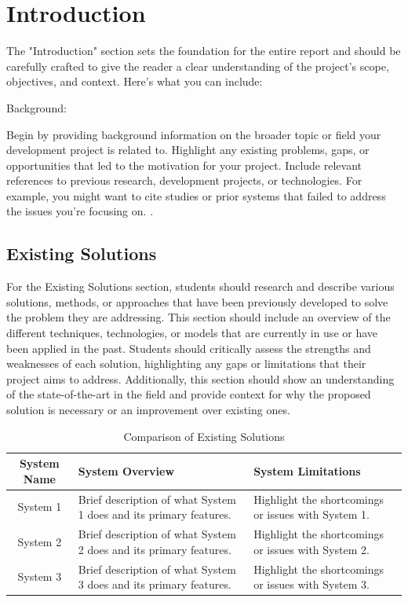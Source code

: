 \chapter{Introduction}
\label{sec:introduction}
The "Introduction" section sets the foundation for the entire report and should be carefully crafted to give the reader a clear understanding of the project’s scope, objectives, and context. Here’s what you can include:

Background:

Begin by providing background information on the broader topic or field your development project is related to.
Highlight any existing problems, gaps, or opportunities that led to the motivation for your project.
Include relevant references to previous research, development projects, or technologies. For example, you might want to cite studies or prior systems that failed to address the issues you're focusing on. \cite{test}.


\section{Existing Solutions}

For the Existing Solutions section, students should research and describe various solutions, methods, or approaches that have been previously developed to solve the problem they are addressing. This section should include an overview of the different techniques, technologies, or models that are currently in use or have been applied in the past. Students should critically assess the strengths and weaknesses of each solution, highlighting any gaps or limitations that their project aims to address. Additionally, this section should show an understanding of the state-of-the-art in the field and provide context for why the proposed solution is necessary or an improvement over existing ones.


\begin{table}[H]
\centering
\caption{Comparison of Existing Solutions}
\begin{tabular}{|c|p{5cm}|p{5cm}|}
\hline
\textbf{System Name}   & \textbf{System Overview} & \textbf{System Limitations} \\ \hline
System 1               & Brief description of what System 1 does and its primary features. & Highlight the shortcomings or issues with System 1. \\ \hline
System 2               & Brief description of what System 2 does and its primary features. & Highlight the shortcomings or issues with System 2. \\ \hline
System 3               & Brief description of what System 3 does and its primary features. & Highlight the shortcomings or issues with System 3. \\ \hline
\end{tabular}
\label{tab:system_comparison}
\end{table}

